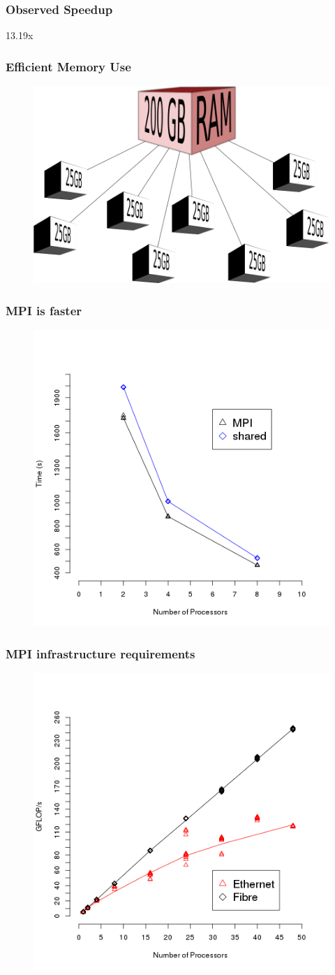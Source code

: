 \begin{frame}
		\frametitle{Observed Speedup}
			\Huge{\centerline{13.19x}}
	\end{frame}

\begin{frame}
		\frametitle{Efficient Memory Use}
		\begin{figure}
				\includegraphics[width=0.8\linewidth]{figures/diagrams/splitmem/memsplit}
		\end{figure}
\end{frame}

\begin{frame}
		\frametitle{MPI is faster}
		\begin{figure}
				\includegraphics[width=0.65\linewidth]{figures/diagrams/comparison/comparison}
		\end{figure}
\end{frame}

\begin{frame}
		\frametitle{MPI infrastructure requirements}
		\begin{figure}
				\includegraphics[width=0.65\linewidth]{figures/diagrams/connection/connection}
		\end{figure}
\end{frame}


